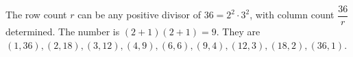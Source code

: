 The row count $r$ can be any positive divisor of $36=2^2\cdot 3^2$, with column count $\dfrac{36}{r}$ determined. The number is $(2+1)(2+1)=\boxed 9$. They are $(1,36),(2,18),(3,12),(4,9),(6,6),(9,4),(12,3),(18,2),(36,1)$.
